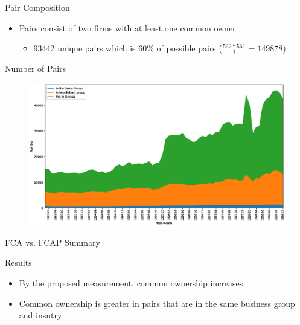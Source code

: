 \documentclass{beamer}
\begin{document}
	\begin{frame}{Pair Composition}
		\begin{itemize}
		
			\item Pairs consist of two firms  with at least one common owner
			\begin{itemize}
				\item  93442 unique pairs which is 60\% of possible pairs 
				\tiny ($ \frac{562*561}{2}= 149878 $)
				\normalsize
			\end{itemize}
		\end{itemize}
		
		\begin{table}[htbp]
			\centering
			{
				\footnotesize
			
				
			}
		\end{table}
		
		
		\begin{table}
			\resizebox{0.7\textwidth}{!}
			{
				
			}
		\end{table}%
		
	\end{frame}  
	
	
	

	\begin{frame}{Number of Pairs}
		\begin{figure}[htbp]
			\includegraphics[width=0.9\linewidth]{Output/idMonth.eps}
		\end{figure}
	\end{frame}
	
	
	
	
	\begin{frame}{FCA vs. FCAP Summary}
		\begin{table}[htbp]
			\centering
			\resizebox{0.8\textwidth}{!}
			{
				  }          
		\end{table}%
		\begin{block}{Results}
			\small
			\begin{itemize}
				\item By the proposed measurement, common ownership increases
				\item Common ownership is greater in pairs that  are in the same business group and insutry
			\end{itemize}
		\end{block}
	\end{frame}
	
\end{document}
